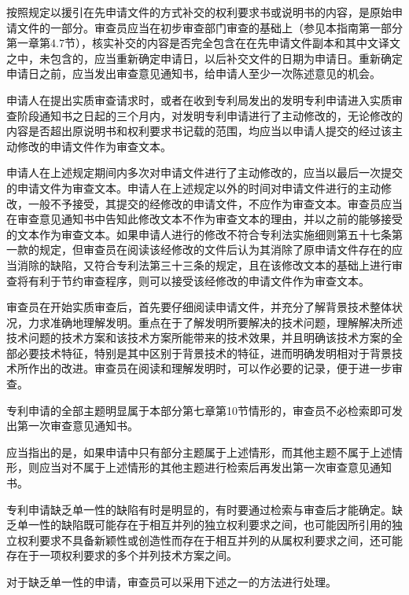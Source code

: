 按照规定以援引在先申请文件的方式补交的权利要求书或说明书的内容，是原始申请文件的一部分。审查员应当在初步审查部门审查的基础上（参见本指南第一部分第一章第4.7节），核实补交的内容是否完全包含在在先申请文件副本和其中文译文之中，未包含的，应当重新确定申请日，以后补交文件的日期为申请日。重新确定申请日之前，应当发出审查意见通知书，给申请人至少一次陈述意见的机会。

申请人在提出实质审查请求时，或者在收到专利局发出的发明专利申请进入实质审查阶段通知书之日起的三个月内，对发明专利申请进行了主动修改的，无论修改的内容是否超出原说明书和权利要求书记载的范围，均应当以申请人提交的经过该主动修改的申请文件作为审查文本。

申请人在上述规定期间内多次对申请文件进行了主动修改的，应当以最后一次提交的申请文件为审查文本。申请人在上述规定以外的时间对申请文件进行的主动修改，一般不予接受，其提交的经修改的申请文件，不应作为审查文本。审查员应当在审查意见通知书中告知此修改文本不作为审查文本的理由，并以之前的能够接受的文本作为审查文本。如果申请人进行的修改不符合专利法实施细则第五十七条第一款的规定，但审查员在阅读该经修改的文件后认为其消除了原申请文件存在的应当消除的缺陷，又符合专利法第三十三条的规定，且在该修改文本的基础上进行审查将有利于节约审查程序，则可以接受该经修改的申请文件作为审查文本。

审查员在开始实质审查后，首先要仔细阅读申请文件，并充分了解背景技术整体状况，力求准确地理解发明。重点在于了解发明所要解决的技术问题，理解解决所述技术问题的技术方案和该技术方案所能带来的技术效果，并且明确该技术方案的全部必要技术特征，特别是其中区别于背景技术的特征，进而明确发明相对于背景技术所作出的改进。审查员在阅读和理解发明时，可以作必要的记录，便于进一步审查。

专利申请的全部主题明显属于本部分第七章第10节情形的，审查员不必检索即可发出第一次审查意见通知书。

应当指出的是，如果申请中只有部分主题属于上述情形，而其他主题不属于上述情形，则应当对不属于上述情形的其他主题进行检索后再发出第一次审查意见通知书。

专利申请缺乏单一性的缺陷有时是明显的，有时要通过检索与审查后才能确定。缺乏单一性的缺陷既可能存在于相互并列的独立权利要求之间，也可能因所引用的独立权利要求不具备新颖性或创造性而存在于相互并列的从属权利要求之间，还可能存在于一项权利要求的多个并列技术方案之间。

对于缺乏单一性的申请，审查员可以采用下述之一的方法进行处理。

